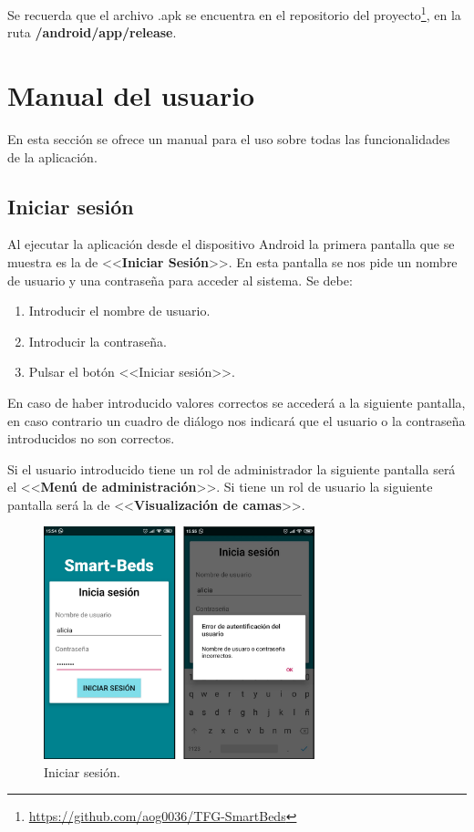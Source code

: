 Se recuerda que el archivo .apk se encuentra en el repositorio del proyecto\footnote{\url{https://github.com/aog0036/TFG-SmartBeds}}, en la ruta \textbf{/android/app/release}.

\section{Manual del usuario}

En esta sección se ofrece un manual para el uso sobre todas las funcionalidades de la aplicación. 

\subsection{Iniciar sesión}

Al ejecutar la aplicación desde el dispositivo Android la primera pantalla que se muestra es la de <<\textbf{Iniciar Sesión}>>. En esta pantalla se nos pide un nombre de usuario y una contraseña para acceder al sistema. Se debe: 

\begin{enumerate}
	\item Introducir el nombre de usuario. 
	\item Introducir la contraseña. 
	\item Pulsar el botón <<Iniciar sesión>>. 
\end{enumerate}

En caso de haber introducido valores correctos se accederá a la siguiente pantalla, en caso contrario un cuadro de diálogo nos indicará que el usuario o la contraseña introducidos no son correctos. 

Si el usuario introducido tiene un rol de administrador la siguiente pantalla será el <<\textbf{Menú de administración}>>. Si tiene un rol de usuario la siguiente pantalla será la de <<\textbf{Visualización de camas}>>. 

\begin{figure}[H]
	\centering
	\includegraphics[width=0.7\textwidth]{../img/iniciasesion.png}
	\caption{Iniciar sesión.}
	\label{fig:iniciasesion}
\end{figure}

